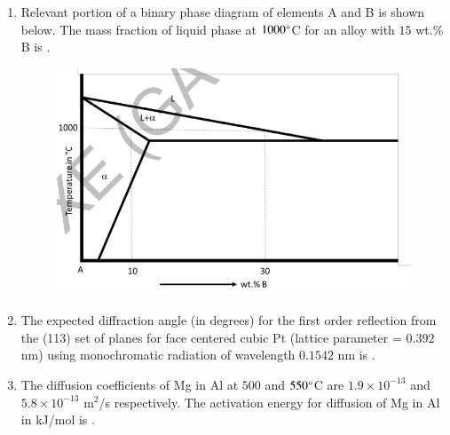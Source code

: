 \documentclass[a4paper,10pt]{article}
\begin{document}
\begin{enumerate}
    \item Relevant portion of a binary phase diagram of elements A and B is shown below. The mass fraction of liquid phase at $1000 \degree$C for an alloy with $15$ wt.\% B is \underline{\hspace{2cm}}.
    \begin{figure}[H] \centering \includegraphics[width=0.6\columnwidth]{q20_material.png} \caption*{} \label{fig:q20_material} \end{figure}
    
    \hfill{}

    \item The expected diffraction angle (in degrees) for the first order reflection from the (113) set of planes for face centered cubic Pt (lattice parameter = $0.392$ nm) using monochromatic radiation of wavelength $0.1542$ nm is \underline{\hspace{2cm}}.
    
    \hfill{}
    
    \item The diffusion coefficients of Mg in Al at $500$ and $550 \degree$C are $1.9 \times 10^{-13}$ and $5.8 \times 10^{-13}$ m$^2$/s respectively. The activation energy for diffusion of Mg in Al in kJ/mol is \underline{\hspace{2cm}}.
    
    \hfill{}
\end{enumerate}
\clearpage
\end{document}
